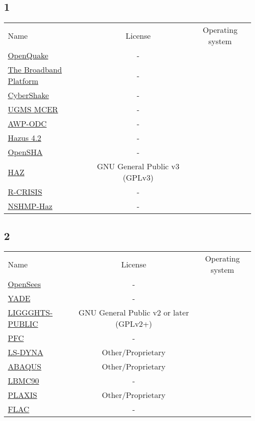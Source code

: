 
\subsection{1}

\begin{table}[]
    \centering
    \begin{tabular}{l|cc}
    \toprule
    Name &  License & Operating system\\ 
        \href{https://www.globalquakemodel.org/openquake}{OpenQuake} & - &\\
        \href{}{The Broadband Platform} & - &\\
        \href{https://scec.usc.edu/scecpedia/CyberShake}{CyberShake} & - &\\
        \href{}{UGMS MCER} & - &\\
        \href{}{AWP-ODC} & - &\\
        \href{}{Hazus 4.2} & - &\\
        \href{}{OpenSHA} & - &\\
        \href{https://github.com/abrahamson/HAZ}{HAZ} &  GNU General Public  v3 (GPLv3) &\\
        \href{http://www.r-crisis.com/}{R-CRISIS} & - &\\
        \href{https://github.com/usgs/nshmp-haz/wiki}{NSHMP-Haz} & - &\\ 
    \bottomrule
    \end{tabular}
\end{table}

\subsection{2}

\begin{table}[]
    \centering
    \begin{tabular}{l|cc}
    \toprule
    Name &  License & Operating system\\ 
        \href{https://opensees.berkeley.edu/}{OpenSees} & - &\\
        \href{https://yade-dem.org/doc/}{YADE} & - &\\
        \href{https://www.cfdem.com/}{LIGGGHTS-PUBLIC} &  GNU General Public  v2 or later (GPLv2+) &\\
        \href{https://www.itascainternational.com/software/pfc}{PFC} & - &\\
        \href{http://www.lstc.com/}{LS-DYNA} &  Other/Proprietary  &\\
        \href{www.simulia.com}{ABAQUS} &  Other/Proprietary  &\\
        \href{http://mimetics-engineering.fr/index.php/en/lmgc90-2/}{LBMC90} & - &\\
        \href{https://www.bentley.com/en/products/brands/plaxis}{PLAXIS} &  Other/Proprietary  &\\
        \href{https://www.itascacg.com/software/FLAC}{FLAC} & - &\\ 
    \bottomrule
    \end{tabular}
\end{table}


